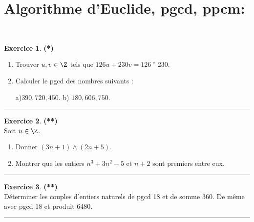 \documentclass[a4paper,11pt]{article}
\theoremstyle{definition}
\newtheorem{exo}{Exercice} %
\begin{document}
\section*{Algorithme d’Euclide, pgcd, ppcm:}\hfill\\%
\begin{minipage}{1\linewidth}
	\begin{minipage}[t]{0.48\linewidth}
		\raggedright
		
		

				
		\begin{exo}\textbf{(*)}\quad\\[0.15cm]
			\begin{enumerate}
				\item Trouver $u,v\in\Z$ tels que $126u+230v = 126 ~^\wedge~ 230$.
				\item Calculer le pgcd des nombres suivants : 
				
				 a)\quad$390, 720, 450.$ \quad\quad b) \quad$180, 606, 750.$
			\end{enumerate}
		
			\centering
			\rule{1\linewidth}{0.6pt}
		\end{exo}
		
						\begin{exo}\textbf{(**)}\quad\\[0.15cm]
			Soit $n\in\Z$.
			\begin{enumerate}
				\item Donner $(3n + 1) \wedge (2n + 5) $.
				\item Montrer que les entiers $n^3 + 3n^2 - 5$ et $n + 2$ sont premiers entre eux.
				
				
			\end{enumerate}  
			
			\centering
			\rule{1\linewidth}{0.6pt}
		\end{exo}
		
		
	
		

		
		
		
	\end{minipage}	
	\hfill\vrule\hfill
	\begin{minipage}[t]{0.48\linewidth}
		\raggedright
		
			\begin{exo}\textbf{(**)}\quad\\[0.2cm]
			D\'eterminer les couples d'entiers naturels de pgcd
			18 et de somme 360. De m\^eme avec pgcd 18 et produit 6480.
			
			\centering
			\rule{1\linewidth}{0.6pt}
		\end{exo}
		

\end{minipage}
\end{minipage}
\end{document}
